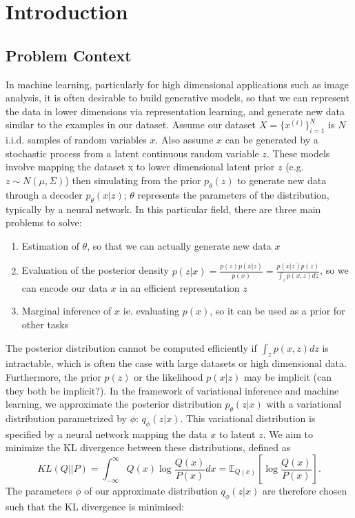 \documentclass[a4paper,12pt]{article}
\begin{document}
\section{Introduction}
\subsection{Problem Context}
In machine learning, particularly for high dimensional applications such as image analysis, it is often desirable to build generative models, so that we can represent the data in lower dimensions via representation learning, and generate new data similar to the examples in our dataset. Assume our dataset $X=\{x^{(i)}\}^N_{i=1}$ is $N$ i.i.d. samples of random variables $x$. Also assume $x$ can be generated by a stochastic process from a latent continuous random variable $z$. These models involve mapping the dataset x to lower dimensional latent prior $z$ (e.g. $z\sim N(\mu,\Sigma)$) then simulating from the prior $p_\theta(z)$ to generate new data through a decoder $p_\theta(x|z)$; $\theta$ represents the parameters of the distribution, typically by a neural network. In this particular field, there are three main problems to solve:
\begin{enumerate}
\item Estimation of $\theta$, so that we can actually generate new data $x$
\item Evaluation of the posterior density $p(z|x) = \frac{p(z)p(x|z)}{p(x)} = \frac{p(x|z)p(z)}{\int_z p(x,z)dz}$, so we can encode our data $x$ in an efficient representation $z$
\item Marginal inference of $x$ ie. evaluating $p(x)$, so it can be used as a prior for other tasks
\end{enumerate}
The posterior distribution cannot be computed efficiently if $\int_z p(x,z)dz$ is intractable, which is often the case with large datasets or high dimensional data. Furthermore, the prior $p(z)$ or the likelihood $p(x|z)$ may be implicit (can they both be implicit?). In the framework of variational inference and machine learning, we approximate the posterior distribution $p_\theta (z|x)$ with a variational distribution parametrized by $\phi$: $q_\phi (z|x)$. This variational distribution is specified by a neural network mapping the data $x$ to latent $z$. We aim to minimize the KL divergence between these distributions, defined as 
\[KL(Q||P)=\int_{-\infty}^\infty Q(x)\log \frac{Q(x)}{P(x)}dx=\mathbb{E}_{Q(x)}\left[\log\frac{Q(x)}{P(x)}\right].\]
The parameters $\phi$ of our approximate distribution $q_\phi (z|x)$ are therefore chosen such that the KL divergence is minimised:
\end{document}
